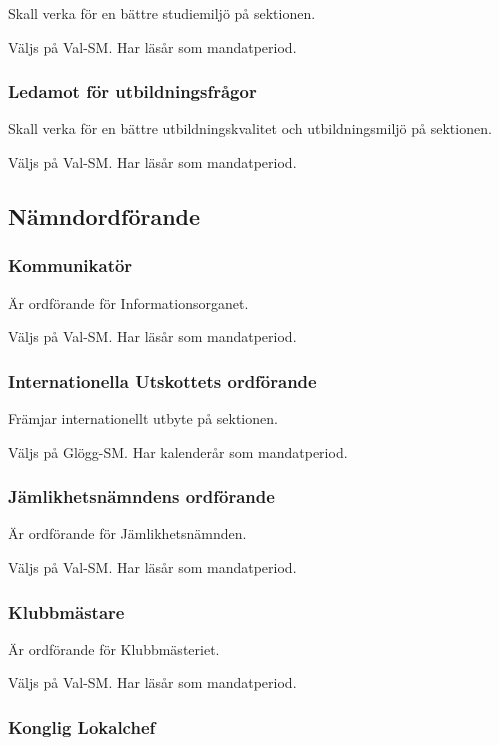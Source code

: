 \documentclass{dgovdoc}
\begin{document}
Skall verka för en bättre studiemiljö på sektionen.

Väljs på Val-SM. Har läsår som mandatperiod.

\subsubsection{Ledamot för utbildningsfrågor}

Skall verka för en bättre utbildningskvalitet och utbildningsmiljö på
sektionen.

Väljs på Val-SM. Har läsår som mandatperiod.

\subsection{Nämndordförande}

\subsubsection{Kommunikatör}

Är ordförande för Informationsorganet.

Väljs på Val-SM. Har läsår som mandatperiod.

\subsubsection{Internationella Utskottets ordförande}

Främjar internationellt utbyte på sektionen.

Väljs på Glögg-SM. Har kalenderår som mandatperiod.

\subsubsection{Jämlikhetsnämndens ordförande}

Är ordförande för Jämlikhetsnämnden.

Väljs på Val-SM. Har läsår som mandatperiod.

\subsubsection{Klubbmästare}

Är ordförande för Klubbmästeriet.

Väljs på Val-SM. Har läsår som mandatperiod.

\subsubsection{Konglig Lokalchef}
\end{document}
